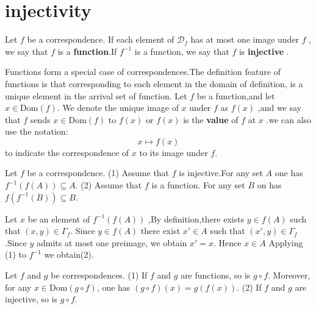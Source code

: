 \documentclass{book}
\numberwithin{equation}{section}
\begin{document}
\section{injectivity}
\begin{definitionenv}
    Let $f$ be a correspondence. If each element of $\mathscr{D}_f$ has at most one image under $f$ , we say that $f$ is a \textbf{function}.If $f^{-1}$ is a function, we say that $f$ is \textbf{injective} .
\end{definitionenv}
\begin{notationenv}
    Functions form a special case of correspondences.The definition feature of functions is that corresponding to each element in the domain of definition, is a unique element in the arrival set of function.
    \newline
    Let $f$ be a function,and let $x\in \mathrm{Dom}(f)$. We denote the unique image of $x$ under $f$ as $f(x)$ ,and we say that $f$ sends $x\in \mathrm{Dom}(f)$ to $f(x)$ or $f(x)$  is the \textbf{value} of $f$ at $x$ .we can also use the notation:
    $$x\mapsto f(x)$$
    to indicate the correspondence of $x$ to its image under $f$.
\end{notationenv}
\begin{propositionenv}\label{proposition3.6.1}
    Let $f$ be a correspondence.
    \newline
    (1) Assume that $f$ is injective.For any set $A$ one has $f^{-1}(f(A))\subseteq A$.
    \newline
    (2) Assume that $f$ is a function. For any set $B$ on has $f(f^{-1}(B))\subseteq B$. 
\end{propositionenv}
\begin{proofenv}
    Let $x$ be an element of $f^{-1}(f(A))$ ,By definition,there exists $y\in f(A)$ such that $(x,y)\in \Gamma_f$. Since $y\in f(A) $ there exist $x'\in A$ such that $(x',y)\in \Gamma_f$.Since $y$ admits at most one preimage, we obtain $x'=x$. Hence $x\in A$
    \newline
    Applying (1) to $f^{-1}$ we obtain(2).
\end{proofenv}
\begin{propositionenv}\label{proposition3.6.2}
    Let \( f \) and \( g \) be correspondences.
\newline
    (1) If \( f \) and \( g \) are functions, so is \( g \circ f \). Moreover, for any \( x \in \text{Dom}(g \circ f) \), one has \((g \circ f)(x) = g(f(x))\).
    \newline
    (2) If \( f \) and \( g \) are injective, so is \( g \circ f \).

\end{propositionenv}
\end{document}
